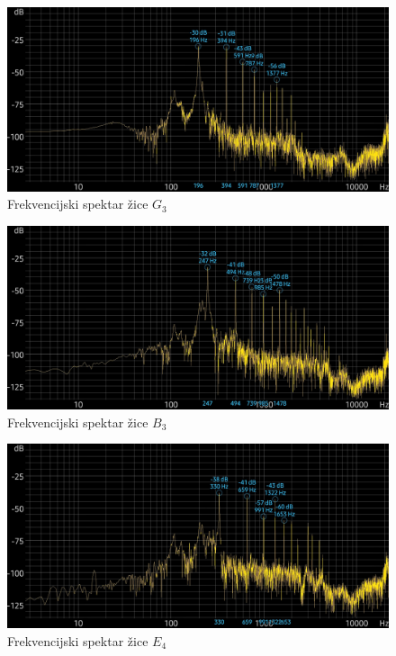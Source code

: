 \documentclass[times, utf8, zavrsni, numeric]{fer}
\begin{document}
\begin{figure}
	\centerline{\includegraphics[width=1\textwidth]{spektrogram_g3.jpg}}
	\caption{Frekvencijski spektar žice $G_3$}
	\label{fig}
\end{figure}
\begin{figure}
	\centerline{\includegraphics[width=1\textwidth]{spektrogram_b3.jpg}}
	\caption{Frekvencijski spektar žice $B_3$}
	\label{fig}
\end{figure}
\begin{figure}
	\centerline{\includegraphics[width=1\textwidth]{spektrogram_e4.jpg}}
	\caption{Frekvencijski spektar žice $E_4$}
	\label{fig}
\end{figure}
\end{document}
